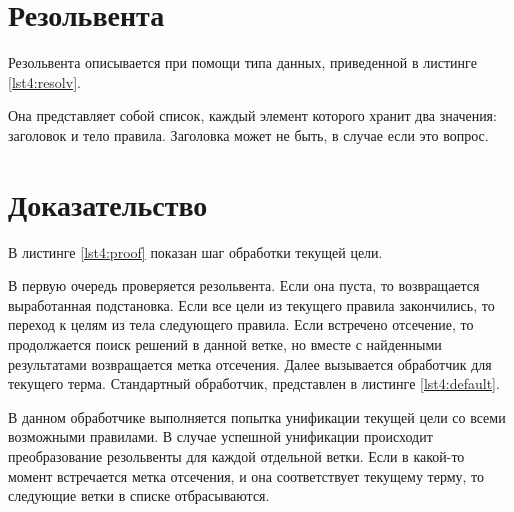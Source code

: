 \section{Резольвента}
Резольвента описывается при помощи типа данных, приведенной в листинге \ref{lst4:resolv}.


Она представляет собой список, каждый элемент которого хранит два значения: заголовок и тело правила. Заголовка может не быть, в случае если это вопрос.

\section{Доказательство}
В листинге \ref{lst4:proof} показан шаг обработки текущей цели.


В первую очередь проверяется резольвента. Если она пуста, то возвращается выработанная подстановка. Если все цели из текущего правила закончились, то переход к целям из тела следующего правила.
Если встречено отсечение, то продолжается поиск решений в данной ветке, но вместе с найденными результатами возвращается метка отсечения.
Далее вызывается обработчик для текущего терма. Стандартный обработчик, представлен в листинге \ref{lst4:default}.


В данном обработчике выполняется попытка унификации текущей цели со всеми возможными правилами. В случае успешной унификации происходит преобразование резольвенты для каждой отдельной ветки. Если в какой-то момент встречается метка отсечения, и она соответствует текущему терму, то следующие ветки в списке отбрасываются.


